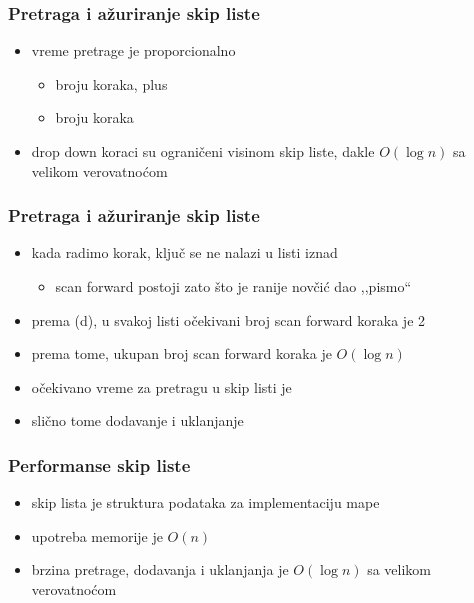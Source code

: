 \documentclass[compress]{beamer}
\begin{document}
\begin{frame}[fragile]
  \frametitle{Pretraga i ažuriranje skip liste}
  \begin{itemize}
    \item vreme pretrage je proporcionalno
    \begin{itemize}
      \item broju  koraka, plus
      \item broju  koraka
    \end{itemize}
    \item drop down koraci su ograničeni visinom skip liste, dakle $O(\log n)$ sa velikom verovatnoćom
  \end{itemize}
\end{frame}

\begin{frame}[fragile]
  \frametitle{Pretraga i ažuriranje skip liste}
  \begin{itemize}
    \item kada radimo  korak, ključ se ne nalazi u listi iznad
    \begin{itemize}
      \item scan forward postoji zato što je ranije novčić dao ,,pismo``
    \end{itemize}
    \item prema (d), u svakoj listi očekivani broj scan forward koraka je 2
    \item prema tome, ukupan broj scan forward koraka je $O(\log n)$
    \item očekivano vreme za pretragu u skip listi je 
    \item slično tome dodavanje i uklanjanje
  \end{itemize}
\end{frame}

\begin{frame}[fragile]
  \frametitle{Performanse skip liste}
  \begin{itemize}
    \item skip lista je struktura podataka za implementaciju mape
    \item upotreba memorije je $O(n)$
    \item brzina pretrage, dodavanja i uklanjanja je $O(\log n)$ sa velikom verovatnoćom
  \end{itemize}
\end{frame}
\end{document}
